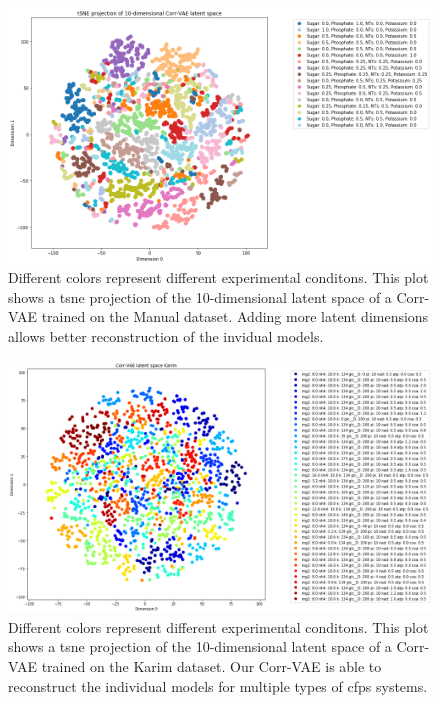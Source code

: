 \begin{figure}[t!]
\begin{center}
\includegraphics[width=1.01\textwidth]{figs/TSNE_hand_latent10.png}
\caption[Projection of the latent space of a 10-dimensional Corr-VAE trained on the Manual dataset]{Different colors represent different experimental conditons.
This plot shows a \gls{tsne} projection of the 10-dimensional latent space of a Corr-VAE trained on the Manual dataset.
Adding more latent dimensions allows better reconstruction of the invidual models.
}
\label{fig:manual_10d}
\end{center}
\end{figure}

\begin{figure}[t!]
\begin{center}
\includegraphics[width=1.01\textwidth]{figs/corrvae_karim_10d_latent.png}
\caption[Projection of the latent space of a 10-dimensional Corr-VAE trained on the Karim dataset]{Different colors represent different experimental conditons.
This plot shows a \gls{tsne} projection of the 10-dimensional latent space of a Corr-VAE trained on the Karim dataset.
Our Corr-VAE is able to reconstruct the individual models for multiple types of \gls{cfps} systems.
}
\label{fig:karim_10d}
\end{center}
\end{figure}

